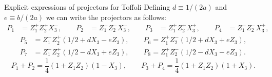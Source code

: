 \begin{tbox}[label=tcolorbox:toffoli]{Explicit expressions of projectors for Toffoli}
\fontsize{10pt}{10pt}\selectfont
    Defining $d\equiv 1/(2a)$ and $e\equiv b/(2a)$ we can write the projectors as follows:
	\begin{equation*}
	\begin{aligned}
		P_1 &= Z_1^+ Z_2^+ X_3^-,
		\qquad
		P_2 &= Z_1^- Z_2^- X_3^-,
		\qquad
		P_3 &= Z_1^+ Z_2^+ X_3^+,
		\qquad
		P_4 &= Z_1^- Z_2^- X_3^+,
	\end{aligned}
	\end{equation*}
	\begin{equation*}
	\begin{aligned}
        P_5 &= Z_1^- Z_2^+ \left( 1/2 + d X_3 - e Z_3 \right), \qquad
        P_6 = Z_1^+ Z_2^- \left( 1/2 + d X_3 + e Z_3 \right), \\
        P_7 &= Z_1^- Z_2^+ \left( 1/2 - d X_3 + e Z_3 \right), \qquad
        P_8 = Z_1^+ Z_2^- \left( 1/2 - d X_3 - e Z_3 \right).
	\end{aligned}
	\end{equation*}
	\begin{equation*}
		P_1 + P_2 = \frac{1}{4} (1 + Z_1 Z_2) (1 - X_3),
		\qquad
		P_3 + P_4 = \frac{1}{4} (1 + Z_1 Z_2) (1 + X_3).

\end{equation*}
\end{tbox}

